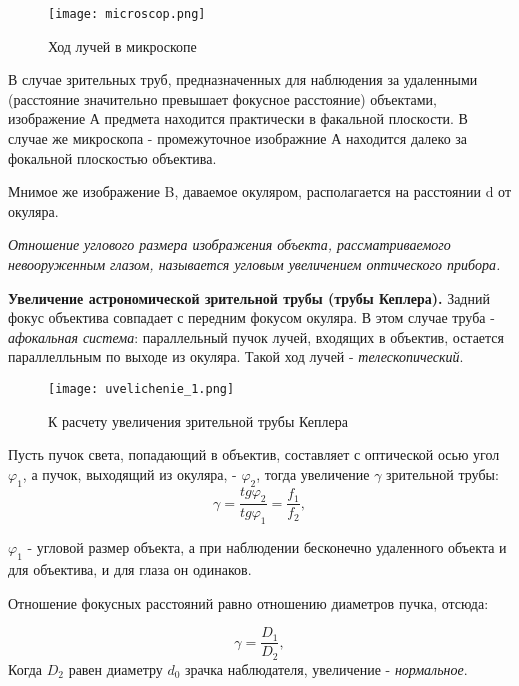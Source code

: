 \documentclass[12pt,a4paper]{article}
\begin{document}
\begin{figure}[H]
    \begin{center}
    \texttt{[image: microscop.png]}
    \caption{ Ход лучей в микроскопе}
    \label{micro} %
    \end{center}
\end{figure}

В случае зрительных труб, предназначенных для наблюдения за удаленными (расстояние значительно превышает фокусное расстояние) объектами, изображение А предмета находится практически в факальной плоскости.
В случае же микроскопа  - промежуточное изображние А находится далеко за фокальной плоскостью объектива.
\par
Мнимое же изображение B, даваемое окуляром, располагается на расстоянии d от окуляра.
\par
\textit{Отношение углового размера изображения объекта, рассматриваемого невооруженным 
глазом, называется угловым увеличением оптического прибора.} 
\par
\textbf{Увеличение астрономической зрительной трубы (трубы Кеплера).}  Задний фокус объектива совпадает
с передним фокусом окуляра. В этом случае труба  - \textit{афокальная система}: параллельный пучок лучей, входящих в объектив, остается параллелльным по выходе
из окуляра. Такой ход лучей - \textit{телескопический}.

\begin{figure}[H]
    \begin{center}
    \texttt{[image: uvelichenie\_1.png]}
    \caption{ К расчету увеличения зрительной трубы Кеплера}
    \label{uvelichenie_1} %
    \end{center}
\end{figure}

Пусть пучок света, попадающий в объектив, составляет с оптической осью угол $\varphi_1$, а пучок, выходящий из окуляра, - $\varphi_2$, тогда увеличение $\gamma$ зрительной трубы:
\begin{equation}
    \gamma = \frac{tg\varphi_2}{tg\varphi_1} = \frac{f_1}{f_2}, \label{eq:gamma_1}
\end{equation}

$\varphi_1$ - угловой размер объекта, а при наблюдении бесконечно удаленного объекта и для объектива, и для глаза он одинаков.

Отношение фокусных расстояний равно отношению диаметров пучка, отсюда:

\begin{equation}
    \gamma = \frac{D_1}{D_2}, \label{eq:gamma_2}
\end{equation}
Когда $D_2$ равен диаметру $d_0$ зрачка наблюдателя, увеличение  - \textit{нормальное}.
\end{document}
